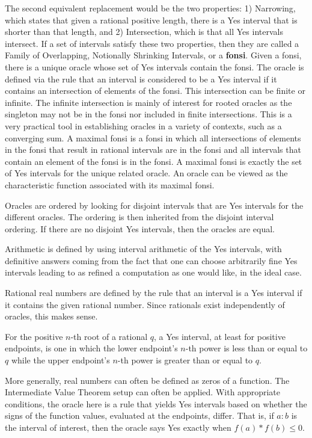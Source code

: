 \documentclass[12pt]{article}
\begin{document}
The second equivalent replacement would be the two properties: 1) Narrowing, which states that given a rational positive length, there is a Yes interval that is shorter than that length, and 2) Intersection, which is that all Yes intervals intersect. If a set of intervals satisfy these two properties, then they are called a Family of Overlapping, Notionally Shrinking Intervals, or a \textbf{fonsi}. Given a fonsi, there is a unique oracle whose set of Yes intervals contain the fonsi. The oracle is defined via the rule that an interval is considered to be a Yes interval if it contains an intersection of elements of the fonsi. This intersection can be finite or infinite. The infinite intersection is mainly of interest for rooted oracles as the singleton may not be in the fonsi nor included in finite intersections. This is a very practical tool in establishing oracles in a variety of contexts, such as a converging sum. A maximal fonsi is a fonsi in which all intersections of elements in the fonsi that result in rational intervals are in the fonsi and all intervals that contain an element of the fonsi is in the fonsi. A maximal fonsi is exactly the set of Yes intervals for the unique related oracle. An oracle can be viewed as the characteristic function associated with its maximal fonsi. 

Oracles are ordered by looking for disjoint intervals that are Yes intervals for the different oracles. The ordering is then inherited from the disjoint interval ordering. If there are no disjoint Yes intervals, then the oracles are equal. 

Arithmetic is defined by using interval arithmetic of the Yes intervals, with definitive answers coming from the fact that one can choose arbitrarily fine Yes intervals leading to as refined a computation as one would like, in the ideal case.  

Rational real numbers are defined by the rule that an interval is a Yes interval if it contains the given rational number. Since rationals exist independently of oracles, this makes sense. 

For the positive $n$-th root of a rational $q$, a Yes interval, at least for positive endpoints, is one in which the lower endpoint's $n$-th power is less than or equal to $q$ while the upper endpoint's $n$-th power is greater than or equal to $q$.

More generally, real numbers can often be defined as zeros of a function. The Intermediate Value Theorem setup can often be applied. With appropriate conditions, the oracle here is a rule that yields Yes intervals based on whether the signs of the function values, evaluated at the endpoints, differ. That is, if $a:b$ is the interval of interest, then the oracle says Yes exactly when $f(a)*f(b) \leq 0$.
\end{document}
